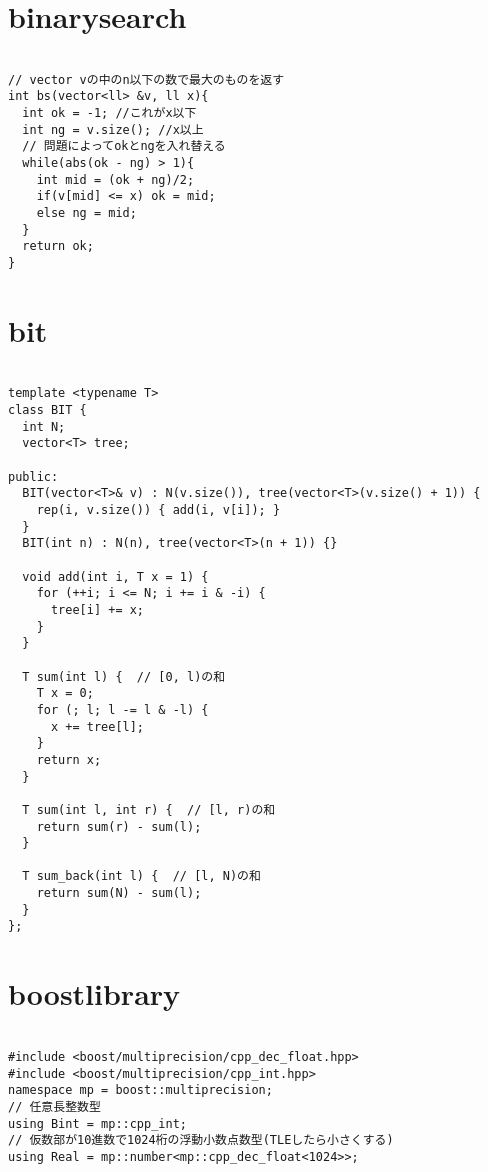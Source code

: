 \documentclass{jsarticle}
\begin{document}
\color{white}
\section{binarysearch}
\color{black}
\begin{lstlisting}[caption=binarysearch]

// vector vの中のn以下の数で最大のものを返す
int bs(vector<ll> &v, ll x){
  int ok = -1; //これがx以下 
  int ng = v.size(); //x以上 
  // 問題によってokとngを入れ替える
  while(abs(ok - ng) > 1){
    int mid = (ok + ng)/2;
    if(v[mid] <= x) ok = mid;
    else ng = mid;
  }
  return ok;
}

\end{lstlisting}

\color{white}
\section{bit}
\color{black}
\begin{lstlisting}[caption=bit]

template <typename T>
class BIT {
  int N;
  vector<T> tree;

public:
  BIT(vector<T>& v) : N(v.size()), tree(vector<T>(v.size() + 1)) {
    rep(i, v.size()) { add(i, v[i]); }
  }
  BIT(int n) : N(n), tree(vector<T>(n + 1)) {}

  void add(int i, T x = 1) {
    for (++i; i <= N; i += i & -i) {
      tree[i] += x;
    }
  }

  T sum(int l) {  // [0, l)の和
    T x = 0;
    for (; l; l -= l & -l) {
      x += tree[l];
    }
    return x;
  }

  T sum(int l, int r) {  // [l, r)の和
    return sum(r) - sum(l);
  }

  T sum_back(int l) {  // [l, N)の和
    return sum(N) - sum(l);
  }
};

\end{lstlisting}

\color{white}
\section{boostlibrary}
\color{black}
\begin{lstlisting}[caption=boostlibrary]

#include <boost/multiprecision/cpp_dec_float.hpp>
#include <boost/multiprecision/cpp_int.hpp>
namespace mp = boost::multiprecision;
// 任意長整数型
using Bint = mp::cpp_int;
// 仮数部が10進数で1024桁の浮動小数点数型(TLEしたら小さくする)
using Real = mp::number<mp::cpp_dec_float<1024>>;

\end{lstlisting}
\end{document}
